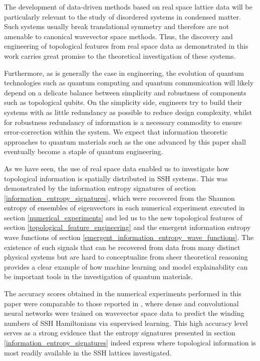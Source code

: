 \documentclass[10pt]{revtex4-1}
\begin{document}
The development of data-driven methods based on real space lattice data will be particularly relevant to the study of disordered systems in condensed matter. Such systems usually break translational symmetry and therefore are not amenable to canonical wavevector space methods. Thus, the discovery and engineering of topological features from real space data as demonstrated in this work carries great promise to the theoretical investigation of these systems.

Furthermore, as is generally the case in engineering, the evolution of quantum technologies such as quantum computing and quantum communication  will likely depend on a delicate balance between simplicity and robustness of components such as topological qubits. On the simplicity side, engineers try to build their systems with as little redundancy as possible to reduce design complexity, whilst for robustness redundancy of information is a necessary commodity to ensure error-correction within the system. We expect that information theoretic approaches to quantum materials such as the one advanced by this paper shall eventually become a staple of quantum engineering.  

As we have seen, the use of real space data enabled us to investigate how topological information is spatially distributed in SSH systems. This was demonstrated by the information entropy signatures of section \ref{information_entropy_signatures}, which were recovered from the Shannon entropy of ensembles of eigenvectors in each numerical experiment executed in section \ref{numerical_experiments} and led us to the new topological features of section \ref{topological_feature_engineering} and the emergent information entropy wave functions of section \ref{emergent_information_entropy_wave_functions}. The existence of such signals that can be recovered from data from many distinct physical systems but are hard to conceptualize from sheer theoretical reasoning provides a clear example of how machine learning and model explainability can be important tools in the investigation of quantum materials.

The accuracy scores obtained in the numerical experiments performed in this paper were comparable to those reported in \cite{PhysRevLett.120.066401}, where dense and convolutional neural networks were trained on wavevector space data to predict the winding numbers of SSH Hamiltonians via supervised learning. This high accuracy level serves as a strong evidence that the entropy signatures presented in section \ref{information_entropy_signatures} indeed express where topological information is most readily available in the SSH lattices investigated.
\end{document}
